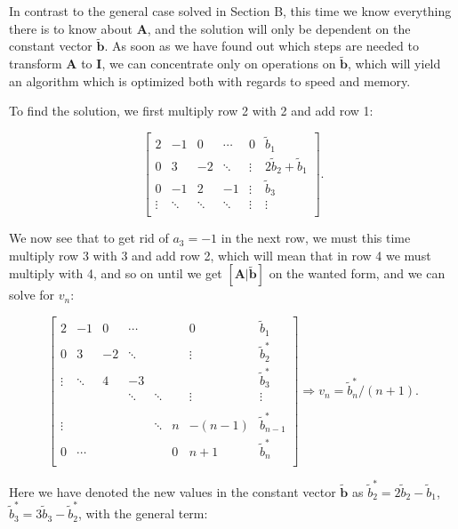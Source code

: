 \documentclass[]{article}
\begin{document}
In contrast to the general case solved in Section B, this time we know everything there is to know about $\mathbf{A}$, and the solution will only be dependent on the constant vector $\mathbf{\tilde{b}}$. As soon as we have found out which steps are needed to transform $\mathbf{A}$ to $\mathbf{I}$, we can concentrate only on operations on $\mathbf{\tilde{b}}$, which will yield an algorithm which is optimized both with regards to speed and memory.

To find the solution, we first multiply row 2 with 2 and add row 1:

\begin{equation*}
\left[ \begin{array} {ccccc|c}
2 & -1 & 0 & \cdots & 0 & \tilde{b}_1\\
0 & 3 & -2 & \ddots & \vdots & 2\tilde{b}_2 + \tilde{b}_1\\
0 & -1 & 2 & -1 & \vdots & \tilde{b}_3\\
\vdots & \ddots & \ddots & \ddots & \vdots & \vdots \\
\end{array} \right].
\end{equation*}

We now see that to get rid of $a_3 = -1$ in the next row, we must this time multiply row 3 with 3 and add row 2, which will mean that in row 4 we must multiply with 4, and so on until we get $[\mathbf{A}|\mathbf{\tilde{b}}]$ on the wanted form, and we can solve for $v_n$:

\begin{equation*}
\left[ \begin{array} {ccccccc|c}
2 & -1 & 0 & \cdots & & & 0 & \tilde{b}_1\\
0 & 3 & -2 & \ddots & & & \vdots & \tilde{b}_{2}^{\ast}\\
\vdots & \ddots & 4 & -3 & & & & \tilde{b}_{3}^{\ast}\\
& & & \ddots & \ddots &&  \vdots& \vdots\\
&&&&&&&\\
\vdots & & & & \ddots & n & -(n-1) & \tilde{b}_{n-1}^{\ast}\\
0 & \cdots & & & & 0 & n+1 & \tilde{b}_{n}^{\ast}\\
\end{array} \right]
\Rightarrow v_n = \tilde{b}_{n}^{\ast} / (n+1).
\end{equation*}

Here we have denoted the new values in the constant vector $\mathbf{\tilde{b}}$ as $\tilde{b}_{2}^{\ast} = 2\tilde{b}_2 - \tilde{b}_1$,
$\tilde{b}_{3}^{\ast} = 3\tilde{b}_3 - \tilde{b}_{2}^{\ast}$, with the general term:
\end{document}
